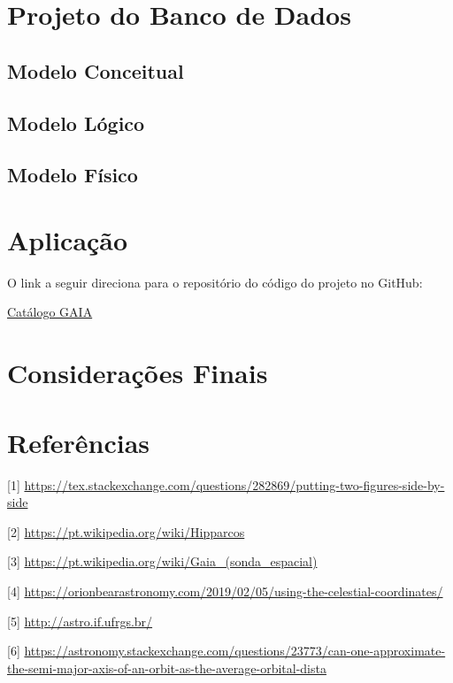 \documentclass[12pt, a4paper]{article}
\begin{document}
	\section{Projeto do Banco de Dados}
	
	\subsection{Modelo Conceitual}
	\subsection{Modelo Lógico}
	\subsection{Modelo Físico}
	
	\section{Aplicação}
	
	O link a seguir direciona para o repositório do código do projeto no GitHub:
	
	\href{https://github.com/Laura-Costa/Catalogo_GAIA}{Catálogo GAIA} 
	\section{Considerações Finais}
	
	\newpage
	\section*{Referências}
	
	\vspace{20pt}
	
	[1] \url{https://tex.stackexchange.com/questions/282869/putting-two-figures-side-by-side}
	
	[2]
	\url{https://pt.wikipedia.org/wiki/Hipparcos}

	[3]
	\url{https://pt.wikipedia.org/wiki/Gaia_(sonda_espacial)}
	
	[4]
	\url{https://orionbearastronomy.com/2019/02/05/using-the-celestial-coordinates/}
	
	[5]
	\url{http://astro.if.ufrgs.br/}
	
	[6]
	\url{https://astronomy.stackexchange.com/questions/23773/can-one-approximate-the-semi-major-axis-of-an-orbit-as-the-average-orbital-dista}
	
\end{document}

